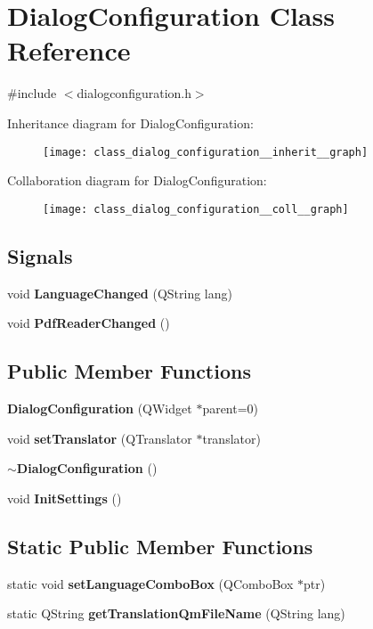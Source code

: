 \section{Dialog\+Configuration Class Reference}
\label{class_dialog_configuration}


{\ttfamily \#include $<$dialogconfiguration.\+h$>$}



Inheritance diagram for Dialog\+Configuration\+:\nopagebreak
\begin{figure}[H]
\begin{center}
\leavevmode
\texttt{[image: class\_dialog\_configuration\_\_inherit\_\_graph]}
\end{center}
\end{figure}


Collaboration diagram for Dialog\+Configuration\+:\nopagebreak
\begin{figure}[H]
\begin{center}
\leavevmode
\texttt{[image: class\_dialog\_configuration\_\_coll\_\_graph]}
\end{center}
\end{figure}
\subsection*{Signals}
\begin{DoxyCompactItemize}
\item 
void \textbf{ Language\+Changed} (Q\+String lang)
\item 
void \textbf{ Pdf\+Reader\+Changed} ()
\end{DoxyCompactItemize}
\subsection*{Public Member Functions}
\begin{DoxyCompactItemize}
\item 
\textbf{ Dialog\+Configuration} (Q\+Widget $\ast$parent=0)
\item 
void \textbf{ set\+Translator} (Q\+Translator $\ast$translator)
\item 
\textbf{ $\sim$\+Dialog\+Configuration} ()
\item 
void \textbf{ Init\+Settings} ()
\end{DoxyCompactItemize}
\subsection*{Static Public Member Functions}
\begin{DoxyCompactItemize}
\item 
static void \textbf{ set\+Language\+Combo\+Box} (Q\+Combo\+Box $\ast$ptr)
\item 
static Q\+String \textbf{ get\+Translation\+Qm\+File\+Name} (Q\+String lang)
\end{DoxyCompactItemize}


